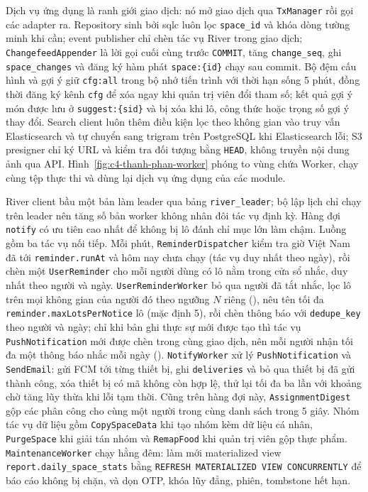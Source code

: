 
Dịch vụ ứng dụng là ranh giới giao dịch: nó mở giao dịch qua \texttt{TxManager} rồi gọi các adapter ra. Repository sinh bởi sqlc luôn lọc \texttt{space\_id} và khóa dòng tường minh khi cần; event publisher chỉ chèn tác vụ River trong giao dịch; \texttt{ChangefeedAppender} là lời gọi cuối cùng trước \texttt{COMMIT}, tăng \texttt{change\_seq}, ghi \texttt{space\_changes} và đăng ký hàm phát \texttt{space:\{id\}} chạy sau commit. Bộ đệm cấu hình và gợi ý giữ \texttt{cfg:all} trong bộ nhớ tiến trình với thời hạn sống 5 phút, đồng thời đăng ký kênh \texttt{cfg} để xóa ngay khi quản trị viên đổi tham số; kết quả gợi ý món được lưu ở \texttt{suggest:\{sid\}} và bị xóa khi lô, công thức hoặc trọng số gợi ý thay đổi. Search client luôn thêm điều kiện lọc theo không gian vào truy vấn Elasticsearch và tự chuyển sang trigram trên PostgreSQL khi Elasticsearch lỗi; S3 presigner chỉ ký URL và kiểm tra đối tượng bằng \texttt{HEAD}, không truyền nội dung ảnh qua API. Hình~\ref{fig:c4-thanh-phan-worker} phóng to vùng chứa Worker, chạy cùng tệp thực thi và dùng lại dịch vụ ứng dụng của các module.


River client bầu một bản làm leader qua bảng \texttt{river\_leader}; bộ lập lịch chỉ chạy trên leader nên tăng số bản worker không nhân đôi tác vụ định kỳ. Hàng đợi \texttt{notify} có ưu tiên cao nhất để  không bị lô đánh chỉ mục lớn làm chậm. Luồng  gồm ba tác vụ nối tiếp. Mỗi phút, \texttt{ReminderDispatcher} kiểm tra giờ Việt Nam đã tới \texttt{reminder.runAt} và hôm nay chưa chạy (tác vụ duy nhất theo ngày), rồi chèn một \texttt{UserReminder} cho mỗi người dùng có lô nằm trong cửa sổ nhắc, duy nhất theo người và ngày. \texttt{UserReminderWorker} bỏ qua người đã tắt nhắc, lọc lô trên mọi không gian của người đó theo ngưỡng $N$ riêng (), nêu tên tối đa \texttt{reminder.maxLotsPerNotice} lô (mặc định 5), rồi chèn thông báo với \texttt{dedupe\_key} theo người và ngày; chỉ khi bản ghi thực sự mới được tạo thì tác vụ \texttt{PushNotification} mới được chèn trong cùng giao dịch, nên mỗi người nhận tối đa một thông báo nhắc mỗi ngày (). \texttt{NotifyWorker} xử lý \texttt{PushNotification} và \texttt{SendEmail}: gửi FCM tới từng thiết bị, ghi \texttt{deliveries} và bỏ qua thiết bị đã gửi thành công, xóa thiết bị có mã không còn hợp lệ, thử lại tối đa ba lần với khoảng chờ tăng lũy thừa khi lỗi tạm thời. Cũng trên hàng đợi này, \texttt{AssignmentDigest} gộp các phân công cho cùng một người trong cùng danh sách trong 5 giây. Nhóm tác vụ dữ liệu gồm \texttt{CopySpaceData} khi tạo nhóm kèm dữ liệu cá nhân, \texttt{PurgeSpace} khi giải tán nhóm và \texttt{RemapFood} khi quản trị viên gộp thực phẩm. \texttt{MaintenanceWorker} chạy hằng đêm: làm mới materialized view \texttt{report.daily\_space\_stats} bằng \texttt{REFRESH MATERIALIZED VIEW CONCURRENTLY} để báo cáo không bị chặn, và dọn OTP, khóa lũy đẳng, phiên, tombstone hết hạn.

